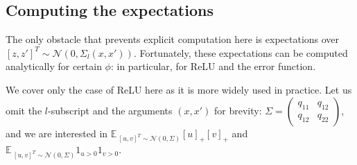 \documentclass{article}
\newcommand{\EE}{\mathbb{E}\,}
\newcommand{\NN}{\mathcal{N}}
\begin{document}
    \subsection{Computing the expectations}

    The only obstacle that prevents explicit computation here is expectations over $[z,z']^T \sim \NN(0,\Sigma_l(x,x'))$.
    Fortunately, these expectations can be computed analytically for certain $\phi$: in particular, for ReLU and the error function.

    We cover only the case of ReLU here as it is more widely used in practice.
    Let us omit the $l$-subscript and the arguments $(x,x')$ for brevity: $\Sigma = \begin{pmatrix} q_{11} & q_{12}\\q_{12} & q_{22} \end{pmatrix}$, and we are interested in $\EE_{[u,v]^T \sim \NN(0,\Sigma)} [u]_+ [v]_+$ and $\EE_{[u,v]^T \sim \NN(0,\Sigma)} 1_{u>0} 1_{v>0}$.
\end{document}
